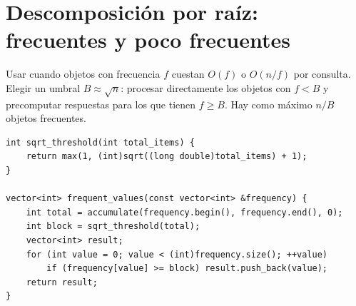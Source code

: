 \section{Descomposici\'on por ra\'iz: frecuentes y poco frecuentes}

Usar cuando objetos con frecuencia $f$ cuestan $O(f)$ o $O(n/f)$ por consulta.
Elegir un umbral $B\approx\sqrt n$: procesar directamente los objetos con
$f<B$ y precomputar respuestas para los que tienen $f\ge B$. Hay como m\'aximo
$n/B$ objetos frecuentes.


\begin{lstlisting}[style=cpp]
int sqrt_threshold(int total_items) {
    return max(1, (int)sqrt((long double)total_items) + 1);
}

vector<int> frequent_values(const vector<int> &frequency) {
    int total = accumulate(frequency.begin(), frequency.end(), 0);
    int block = sqrt_threshold(total);
    vector<int> result;
    for (int value = 0; value < (int)frequency.size(); ++value)
        if (frequency[value] >= block) result.push_back(value);
    return result;
}
\end{lstlisting}

